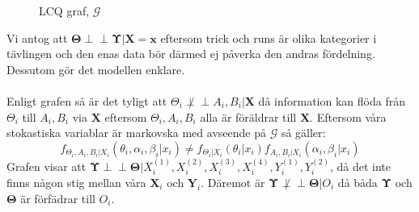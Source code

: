 \documentclass{article}
\newcommand{\independent}{\perp\!\!\!\!\perp}
\begin{document}
\begin{figure}[h]
    \centering
    \caption{LCQ graf, $\mathcal{G}$}
    \label{fig:hierarki}
\end{figure}
Vi antog att $\mathbf{\Theta} \independent \mathbf{\Upsilon} | \mathbf{X} = \mathbf{x}$ eftersom trick och runs är olika kategorier i tävlingen och den enas data bör därmed ej påverka den andras fördelning.
Dessutom gör det modellen enklare.
\\\\
Enligt grafen så är det tyligt att $\Theta_i \not\independent A_i, B_i | \mathbf{X}$ då information kan flöda från $\Theta_i$ till $A_i, B_i$ via $\mathbf{X}$ eftersom $\Theta_i, A_i, B_i$ alla är föräldrar till $\mathbf{X}$.
Eftersom våra stokastiska variablar är markovska med avseende på $\mathcal{G}$ så gäller:
\[
    f_{\Theta_i, A_i, B_i | X_i}(\theta_i, \alpha_i, \beta_i | x_i) \neq f_{\Theta_i | X_i}(\theta_i | x_i)f_{A_i, B_i | X_i}(\alpha_i, \beta_i | x_i)
\]
Grafen visar att $\mathbf{\Upsilon} \independent \mathbf{\Theta} | X_i^{(1)}, X_i^{(2)}, X_i^{(3)}, X_i^{(4)}, Y_i^{(1)}, Y_i^{(2)}$, då det inte finns någon stig mellan våra $\mathbf{X}_i$ och $\mathbf{Y}_i$.
Däremot är $\mathbf{\Upsilon} \not\independent \mathbf{\Theta} | O_i$ då båda $\mathbf{\Upsilon}$ och $\mathbf{\Theta}$ är förfädrar till $O_i$.
\end{document}
